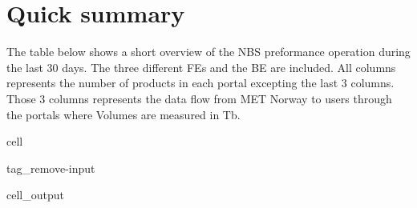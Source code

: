\documentclass[letterpaper,10pt,english]{jupyterBook}
\begin{document}
\chapter{Quick summary}
\label{\detokenize{summary:quick-summary}}\label{\detokenize{summary::doc}}
\sphinxAtStartPar
The table below shows a short overview of the NBS preformance operation during the last 30 days. The three different FEs and the BE are included. All columns represents the number of products in each portal excepting the last 3 columns. Those 3 columns represents the data flow from MET Norway to users through the portals where Volumes are measured in Tb.

\begin{sphinxuseclass}{cell}
\begin{sphinxuseclass}{tag_remove-input}\begin{sphinxVerbatimOutput}

\begin{sphinxuseclass}{cell_output}
\end{sphinxuseclass}\end{sphinxVerbatimOutput}

\end{sphinxuseclass}
\end{sphinxuseclass}
\end{document}
